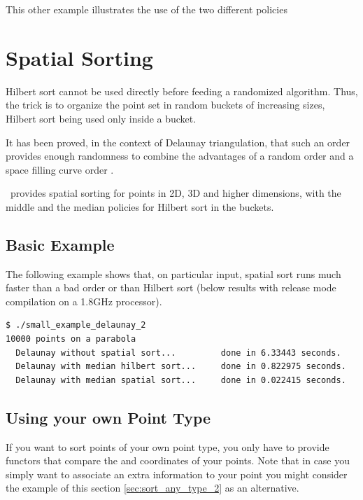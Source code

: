 This other example illustrates the use of the two different policies




\section{Spatial Sorting\label{sec:spatial_sorting}}

Hilbert sort cannot be used directly before feeding a randomized algorithm.
Thus, the trick is to organize the point set in random buckets of increasing
sizes, Hilbert sort being used only inside a bucket.

It has been proved, in the context of Delaunay triangulation, that
such an order provides enough randomness to combine the advantages of a random
 order and a space filling curve order \cite{acr-icb-03}.


\cgal\ provides spatial sorting for points in 2D, 3D and higher dimensions,
with the middle and the median policies for Hilbert sort in the buckets.

\subsection{Basic Example}

The following example shows that, on particular input, spatial sort
runs much faster than a bad order or than Hilbert sort (below results
with release mode compilation on a 1.8GHz processor).
\begin{verbatim}
$ ./small_example_delaunay_2 
10000 points on a parabola
  Delaunay without spatial sort...         done in 6.33443 seconds.
  Delaunay with median hilbert sort...     done in 0.822975 seconds.
  Delaunay with median spatial sort...     done in 0.022415 seconds.
\end{verbatim}



\subsection{Using your own Point Type}
If you want to sort points of your own point type,
you only have to provide functors that compare
the  and  coordinates of your points. Note that in case you simply want
to associate an extra information to your point you might consider the example of this section
\ref{sec:sort_any_type_2}
as an alternative.

